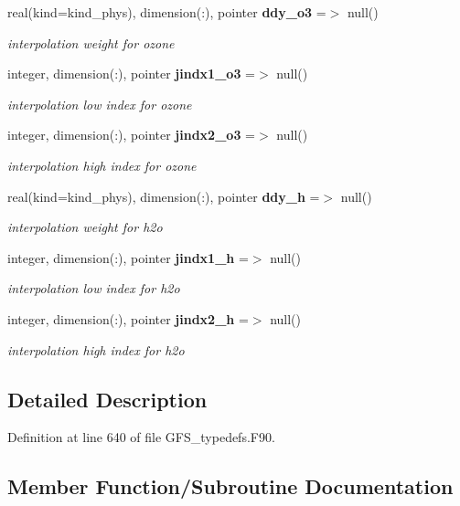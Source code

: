 \begin{DoxyCompactItemize}
real(kind=kind\+\_\+phys), dimension(\+:), pointer \textbf{ ddy\+\_\+o3} =$>$ null()
\begin{DoxyCompactList}\small\item\em interpolation weight for ozone \end{DoxyCompactList}\item 
integer, dimension(\+:), pointer \textbf{ jindx1\+\_\+o3} =$>$ null()
\begin{DoxyCompactList}\small\item\em interpolation low index for ozone \end{DoxyCompactList}\item 
integer, dimension(\+:), pointer \textbf{ jindx2\+\_\+o3} =$>$ null()
\begin{DoxyCompactList}\small\item\em interpolation high index for ozone \end{DoxyCompactList}\item 
real(kind=kind\+\_\+phys), dimension(\+:), pointer \textbf{ ddy\+\_\+h} =$>$ null()
\begin{DoxyCompactList}\small\item\em interpolation weight for h2o \end{DoxyCompactList}\item 
integer, dimension(\+:), pointer \textbf{ jindx1\+\_\+h} =$>$ null()
\begin{DoxyCompactList}\small\item\em interpolation low index for h2o \end{DoxyCompactList}\item 
integer, dimension(\+:), pointer \textbf{ jindx2\+\_\+h} =$>$ null()
\begin{DoxyCompactList}\small\item\em interpolation high index for h2o \end{DoxyCompactList}\end{DoxyCompactItemize}


\subsection{Detailed Description}


Definition at line 640 of file G\+F\+S\+\_\+typedefs.\+F90.



\subsection{Member Function/\+Subroutine Documentation}
\mbox{\label{structgfs__typedefs_1_1gfs__grid__type_aa471c1c2f69d997adca4666a740369ea}} 

